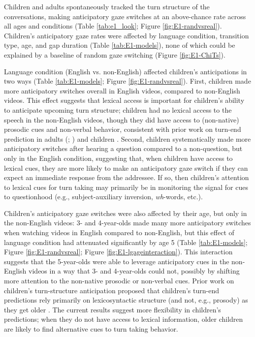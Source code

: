 \documentclass[authoryear, 12pt]{elsarticle}
\begin{document}
Children and adults spontaneously tracked the turn structure of the conversations, making anticipatory gaze switches at an above-chance rate across all ages and conditions (Table \ref{tab:e1_look}; Figure \ref{fig:E1-randvsreal}). Children's anticipatory gaze rates were affected by language condition, transition type, age, and gap duration (Table \ref{tab:E1-models}), none of which could be explained by a baseline of random gaze switching (Figure \ref{fig:E1-ChiTs}).

Language condition (English vs. non-English) affected children's anticipations in two ways (Table \ref{tab:E1-models};  Figure \ref{fig:E1-randvsreal}). First, children made more anticipatory switches overall in English videos, compared to non-English videos. This effect suggests that lexical access is important for children's ability to anticipate upcoming turn structure; children had no lexical access to the speech in the non-English videos, though they did have access to (non-native) prosodic cues and non-verbal behavior, consistent with prior work on turn-end prediction in adults (\citealp{de-ruiter2006}; \citealp{magyari2012}) and children \citep{keitel2013}. Second, children systematically made more anticipatory switches after hearing a question compared to a non-question, but only in the English condition, suggesting that, when children have access to lexical cues, they are more likely to make an anticipatory gaze switch if they can expect an immediate response from the addressee. If so, then children's attention to lexical cues for turn taking may primarily be in monitoring the signal for cues to questionhood (e.g., subject-auxiliary inversion, \textit{wh}-words, etc.).

Children's anticipatory gaze switches were also affected by their age, but only in the non-English videos: 3- and 4-year-olds made many more anticipatory switches when watching videos in English compared to non-English, but this effect of language condition had attenuated significantly by age 5 (Table \ref{tab:E1-models};  Figure \ref{fig:E1-randvsreal}; Figure \ref{fig:E1-lgageinteraction}). This interaction suggests that the 5-year-olds were able to leverage anticipatory cues in the non-English videos in a way that 3- and 4-year-olds could not, possibly by shifting more attention to the non-native prosodic or non-verbal cues. Prior work on children's turn-structure anticipation proposed that children's turn-end predictions rely primarily on lexicosyntactic structure (and not, e.g., prosody) as they get older \citep{keitel2013}. The current results suggest more flexibility in children's predictions; when they do not have access to lexical information, older children are likely to find alternative cues to turn taking behavior.
\end{document}
